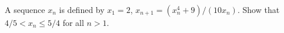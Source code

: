A sequence $x_n$ is defined by $x_1 = 2$, $x_{n+1} = (x_n^4 + 9)/(10x_n)$. Show that $4/5 < x_n \leq 5/4$ for all $n > 1$.
